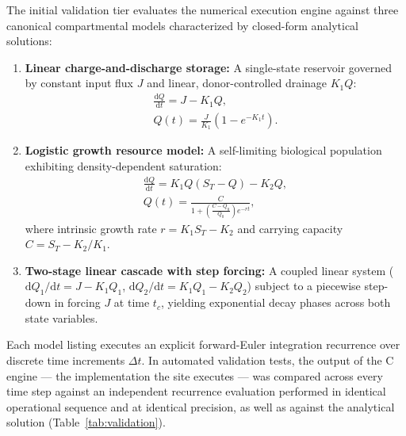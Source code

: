 \documentclass[3p,times,authoryear,twocolumn]{elsarticle}
\begin{document}
The initial validation tier evaluates the numerical execution engine against three canonical compartmental models characterized by closed-form analytical solutions:
\begin{enumerate}
\item \textbf{Linear charge-and-discharge storage:} A single-state reservoir governed by constant input flux $J$ and linear, donor-controlled drainage $K_1Q$:
\begin{equation}
\begin{gathered}
\frac{\mathrm{d}Q}{\mathrm{d}t} = J - K_1Q, \\
Q(t) = \frac{J}{K_1}\left(1 - e^{-K_1t}\right).
\end{gathered}
\end{equation}
\item \textbf{Logistic growth resource model:} A self-limiting biological population exhibiting density-dependent saturation:
\begin{equation}
\begin{gathered}
\frac{\mathrm{d}Q}{\mathrm{d}t} = K_1Q(S_T - Q) - K_2Q, \\
Q(t) = \frac{C}{1 + \left(\frac{C - Q_0}{Q_0}\right)e^{-rt}},
\end{gathered}
\end{equation}
where intrinsic growth rate $r = K_1S_T - K_2$ and carrying capacity $C = S_T - K_2/K_1$.
\item \textbf{Two-stage linear cascade with step forcing:} A coupled linear system ($\mathrm{d}Q_1/\mathrm{d}t = J - K_1Q_1$, $\mathrm{d}Q_2/\mathrm{d}t = K_1Q_1 - K_2Q_2$) subject to a piecewise step-down in forcing $J$ at time $t_c$, yielding exponential decay phases across both state variables.
\end{enumerate}

Each model listing executes an explicit forward-Euler integration recurrence over discrete time increments $\Delta t$. In automated validation tests, the output of the C engine --- the implementation the site executes --- was compared across every time step against an independent recurrence evaluation performed in identical operational sequence and at identical precision, as well as against the analytical solution (Table~\ref{tab:validation}).
\end{document}
